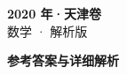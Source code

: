 \documentclass[zihao=-4, a4paper]{ctexart}
\begin{document}
\begin{center}
  {\Large\bfseries 2020 年·天津卷}\\[4pt]
  {\large 数学 · 解析版}
\end{center}
\medskip
{}

\clearpage
{}
\begin{center}{\Large\bfseries 参考答案与详细解析}\end{center}
\medskip

\end{document}
